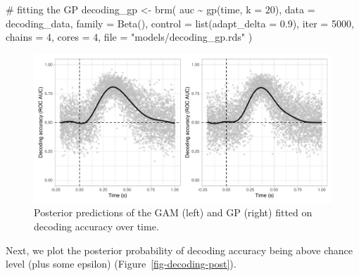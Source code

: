 \documentclass[
  doc,
  floatsintext,
  longtable,
  a4paper,
  nolmodern,
  notxfonts,
  notimes,
  colorlinks=true,linkcolor=blue,citecolor=blue,urlcolor=blue]{apa7}
\newenvironment{Shaded}{\begin{snugshade}}{\end{snugshade}}
\newcommand{\AttributeTok}[1]{\textcolor[rgb]{0.40,0.45,0.13}{#1}}
\newcommand{\CommentTok}[1]{\textcolor[rgb]{0.37,0.37,0.37}{#1}}
\newcommand{\DecValTok}[1]{\textcolor[rgb]{0.68,0.00,0.00}{#1}}
\newcommand{\FloatTok}[1]{\textcolor[rgb]{0.68,0.00,0.00}{#1}}
\newcommand{\FunctionTok}[1]{\textcolor[rgb]{0.28,0.35,0.67}{#1}}
\newcommand{\NormalTok}[1]{\textcolor[rgb]{0.00,0.23,0.31}{#1}}
\newcommand{\OtherTok}[1]{\textcolor[rgb]{0.00,0.23,0.31}{#1}}
\newcommand{\SpecialCharTok}[1]{\textcolor[rgb]{0.37,0.37,0.37}{#1}}
\newcommand{\StringTok}[1]{\textcolor[rgb]{0.13,0.47,0.30}{#1}}
\begin{document}
\begin{Shaded}
\begin{Highlighting}[]
\CommentTok{\# fitting the GP}
\NormalTok{decoding\_gp }\OtherTok{\textless{}{-}} \FunctionTok{brm}\NormalTok{(}
\NormalTok{    auc }\SpecialCharTok{\textasciitilde{}} \FunctionTok{gp}\NormalTok{(time, }\AttributeTok{k =} \DecValTok{20}\NormalTok{),}
    \AttributeTok{data =}\NormalTok{ decoding\_data,}
    \AttributeTok{family =} \FunctionTok{Beta}\NormalTok{(),}
    \AttributeTok{control =} \FunctionTok{list}\NormalTok{(}\AttributeTok{adapt\_delta =} \FloatTok{0.9}\NormalTok{),}
    \AttributeTok{iter =} \DecValTok{5000}\NormalTok{,}
    \AttributeTok{chains =} \DecValTok{4}\NormalTok{,}
    \AttributeTok{cores =} \DecValTok{4}\NormalTok{,}
    \AttributeTok{file =} \StringTok{"models/decoding\_gp.rds"}
\NormalTok{    )}
\end{Highlighting}
\end{Shaded}

\begin{figure}[H]

\caption{Posterior predictions of the GAM (left) and GP (right) fitted
on decoding accuracy over time.}

{\centering \includegraphics[width=1\textwidth,height=\textheight]{brms_meeg_files/figure-pdf/decoding-preds-1.pdf}

}

\end{figure}%

Next, we plot the posterior probability of decoding accuracy being above
chance level (plus some epsilon) (Figure~\ref{fig-decoding-post}).
\end{document}
